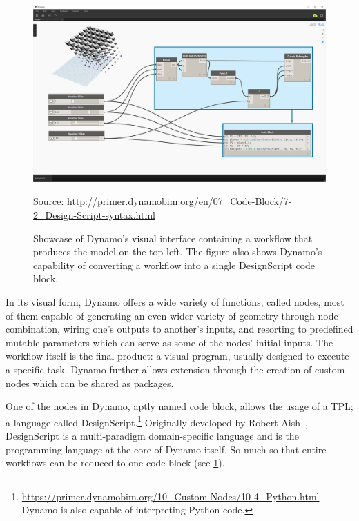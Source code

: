 \begin{figure}[htb]
  \includegraphics[width=\linewidth]{fig/dynamo-node-to-code}
  \begin{minipage}{\linewidth}
  \scriptsize Source:
  \url{http://primer.dynamobim.org/en/07_Code-Block/7-2_Design-Script-syntax.html}
  \end{minipage}
  \caption[Dynamo's visual interface with node to code translation]{
    Showcase of Dynamo's visual interface containing a workflow that produces
    the model on the top left.  The figure also shows Dynamo's capability of
    converting a workflow into a single DesignScript code block.}%
  \label{fig:related.ad.dynamo.node2code}
\end{figure}

In its visual form, Dynamo offers a wide variety of functions, called nodes,
most of them capable of generating an even wider variety of geometry through
node combination, wiring one's outputs to another's inputs, and resorting to
predefined mutable parameters which can serve as some of the nodes' initial
inputs.  The workflow itself is the final product: a visual program, usually
designed to execute a specific task.  Dynamo further allows extension through
the creation of custom nodes which can be shared as packages.

One of the nodes in Dynamo, aptly named code block, allows the usage of a
\ac{TPL}; a language called
DesignScript.\footnote{\url{https://primer.dynamobim.org/10_Custom-Nodes/10-4_Python.html}
--- Dynamo is also capable of interpreting Python code.}
Originally developed by Robert Aish~\cite{Aish:2011:DesignScript}, DesignScript
is a multi-paradigm domain-specific language and is the programming language at
the core of Dynamo itself.  So much so that entire workflows can be reduced to
one code block (see \cref{fig:related.ad.dynamo.node2code}).

